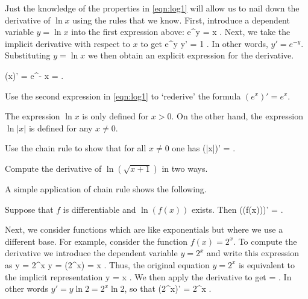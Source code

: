 \documentclass[11pt]{amsart}
\begin{document}
Just the knowledge of the properties in \eqref{eqn:log1} will allow us to nail down the derivative of $\ln x$ using the rules that we know. 
First, introduce a dependent variable $y = \ln x$ into the first expression above:
\beqn
e^y = x .
\eeqn
Next, we take the implicit derivative with respect to $x$ to get
\beqn
e^y y' = 1 .
\eeqn
In other words, $y' = e^{-y}$. 
Substituting $y = \ln x$ we then obtain an explicit expression for the derivative.

\begin{prop} 
\beqn
\left(\ln x\right)' = e^{- \ln x} =  .
\eeqn
\end{prop}

\begin{eg}
Use the second expression in \eqref{eqn:log1} to `rederive' the formula $(e^x)' = e^x$. 
\end{eg}

\vspace{3cm} 

The expression $\ln x$ is only defined for $x > 0$. 
On the other hand, the expression $\ln |x|$ is defined for any $x \ne 0$. 

\begin{eg}
Use the chain rule to show that for all $x \ne 0$ one has 
\beqn
\left(\ln |x|\right)' = .
\eeqn
\end{eg} 

\vspace{3cm}

\begin{eg}
Compute the derivative of $\ln \left(\sqrt{x+1}\right)$ in two ways.
\end{eg}

A simple application of chain rule shows the following. 

\begin{prop}
Suppose that $f$ is differentiable and $\ln (f(x))$ exists. 
Then
\beqn
\left(\ln (f(x))\right)' =  .
\eeqn
\end{prop} 

Next, we consider functions which are like exponentials but where we use a different base. 
For example, consider the function $f(x) = 2^x$.
To compute the derivative we introduce the dependent variable $y = 2^x$ and write this expression as 
\beqn
y = 2^x \leftrightarrow \ln y = \ln (2^x) = x  .
\eeqn
Thus, the original equation $y = 2^x$ is equivalent to the implicit representation 
\beqn
\ln y = x  .
\eeqn
We then apply the derivative to get
\beqn
{} =  .
\eeqn
In other words $y' = y \ln 2 = 2^x \ln 2$, so that
\beqn
\left(2^x\right)' = 2^x  .
\eeqn
\end{document}
